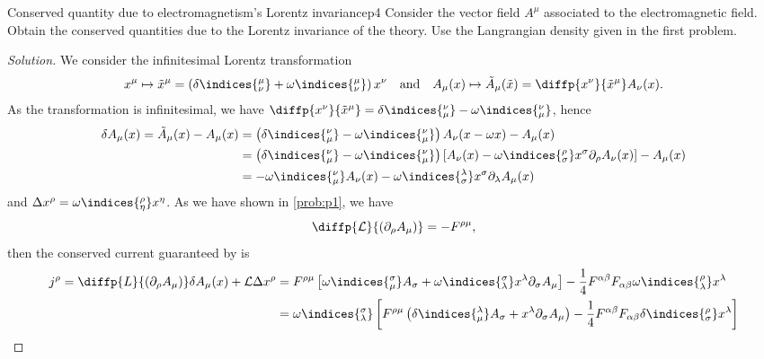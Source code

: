 \begin{problem}{Conserved quantity due to electromagnetism's Lorentz invariance}{p4}
   Consider the vector field \(A^\mu\) associated to the electromagnetic field. Obtain the conserved quantities due to the Lorentz invariance of the theory. Use the Langrangian density given in the first problem.
\end{problem}
\begin{proof}[Solution]
   We consider the infinitesimal Lorentz transformation
   \begin{equation*}
      x^\mu \mapsto \tilde{x}^\mu = \left(\delta\indices{^\mu_\nu} + \omega\indices{^\mu_\nu}\right)x^\nu
      \quad\text{and}\quad
      A_\mu(x) \mapsto \tilde{A}_\mu(\tilde{x}) = \diffp{x^\nu}{\tilde{x}^\mu} A_\nu(x).
   \end{equation*}
   As the transformation is infinitesimal, we have \(\diffp{x^\nu}{\tilde{x}^\mu} = \delta\indices{^\nu_\mu} - \omega\indices{^\nu_\mu}\), hence
   \begin{align*}
      \delta A_\mu(x) = \tilde{A}_\mu(x) - A_\mu(x) 
      &=\left(\delta\indices{^\nu_\mu} - \omega\indices{^\nu_\mu}\right) A_\nu(x - \omega x) - A_\mu(x)\\
      &=\left(\delta\indices{^\nu_\mu} - \omega\indices{^\nu_\mu}\right) \left[A_\nu(x) - \omega\indices{^\rho_\sigma} x^\sigma \partial_\rho A_\nu(x)\right] - A_\mu(x)\\
      &=  - \omega\indices{^\nu_\mu} A_\nu(x) - \omega\indices{^\lambda_\sigma} x^\sigma \partial_\lambda A_\mu(x)
   \end{align*}
   and \(\Delta x^\rho = \omega\indices{^\rho_\eta}x^\eta\). As we have shown in \cref{prob:p1}, we have
   \begin{equation*}
      \diffp{\mathcal{L}}{(\partial_\rho A_\mu)} = - F^{\rho\mu},
   \end{equation*}
   then the conserved current guaranteed by  is
   \begin{align*}
      j^\rho = \diffp{L}{(\partial_\rho A_\mu)}\delta A_\mu(x) + \mathcal{L} \Delta x^\rho
      &= F^{\rho\mu} \left[\omega\indices{^\sigma_\mu} A_\sigma + \omega\indices{^\sigma_\lambda} x^\lambda \partial_\sigma A_\mu\right] - \frac14 F^{\alpha \beta}F_{\alpha \beta} \omega\indices{^\rho_\lambda} x^\lambda\\
      &= \omega\indices{^\sigma_\lambda}\left[F^{\rho \mu}\left(\delta\indices{^\lambda_\mu} A_\sigma + x^\lambda \partial_\sigma A_\mu\right) - \frac14 F^{\alpha \beta}F_{\alpha \beta} \delta\indices{^\rho_\sigma}x^\lambda\right]\\

\end{align*}
\end{proof}

